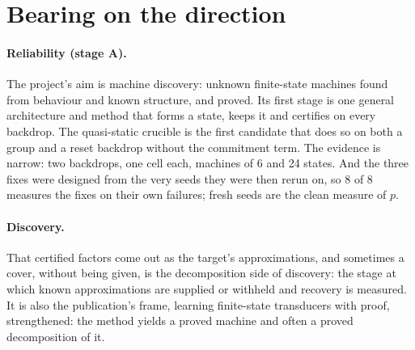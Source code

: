 \documentclass[11pt]{article}
\begin{document}
\section{Bearing on the direction}

\paragraph{Reliability (stage A).} The project's aim is machine discovery: unknown finite-state
machines found from behaviour and known structure, and proved. Its first stage is one general
architecture and method that forms a state, keeps it and certifies on every backdrop. The
quasi-static crucible is the first candidate that does so on both a group and a reset backdrop
without the commitment term. The evidence is narrow: two backdrops, one cell each, machines of 6 and
24 states. And the three fixes were designed from the very seeds they were then rerun on, so 8 of 8
measures the fixes on their own failures; fresh seeds are the clean measure of $p$.

\paragraph{Discovery.} That certified factors come out as the target's approximations, and sometimes
a cover, without being given, is the decomposition side of discovery: the stage at which known
approximations are supplied or withheld and recovery is measured. It is also the publication's
frame, learning finite-state transducers with proof, strengthened: the method yields a proved
machine and often a proved decomposition of it.
\end{document}
